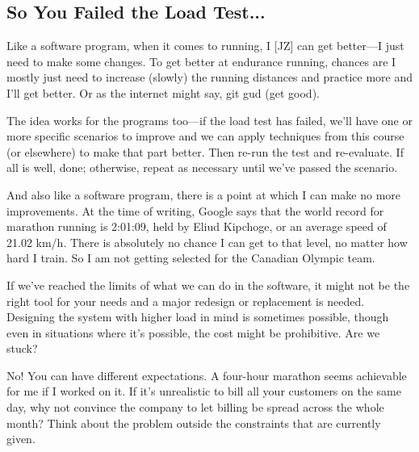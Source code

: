 \subsection*{So You Failed the Load Test...}
Like a software program, when it comes to running, I [JZ] can get better---I just need to make some changes. To get better at endurance running, chances are I mostly just need to increase (slowly) the running distances and practice more and I'll get better. Or as the internet might say, git gud (get good).

The idea works for the programs too---if the load test has failed, we'll have one or more specific scenarios to improve and we can apply techniques from this course (or elsewhere) to make that part better. Then re-run the test and re-evaluate. If all is well, done; otherwise, repeat as necessary until we've passed the scenario.

And also like a software program, there is a point at which I can make no more improvements. At the time of writing, Google says that the world record for marathon running is 2:01:09, held by Eliud Kipchoge, or an average speed of 21.02 km/h. There is absolutely no chance I can get to that level, no matter how hard I train. So I am not getting selected for the Canadian Olympic team.

If we've reached the limits of what we can do in the software, it might not be the right tool for your needs and a major redesign or replacement is needed. Designing the system with higher load in mind is sometimes possible, though even in situations where it's possible, the cost might be prohibitive.  Are we stuck?

No! You can have different expectations. A four-hour marathon seems achievable for me if I worked on it.  If it's unrealistic to bill all your customers on the same day, why not convince the company to let billing be spread across the whole month? Think about the problem outside the constraints that are currently given.

